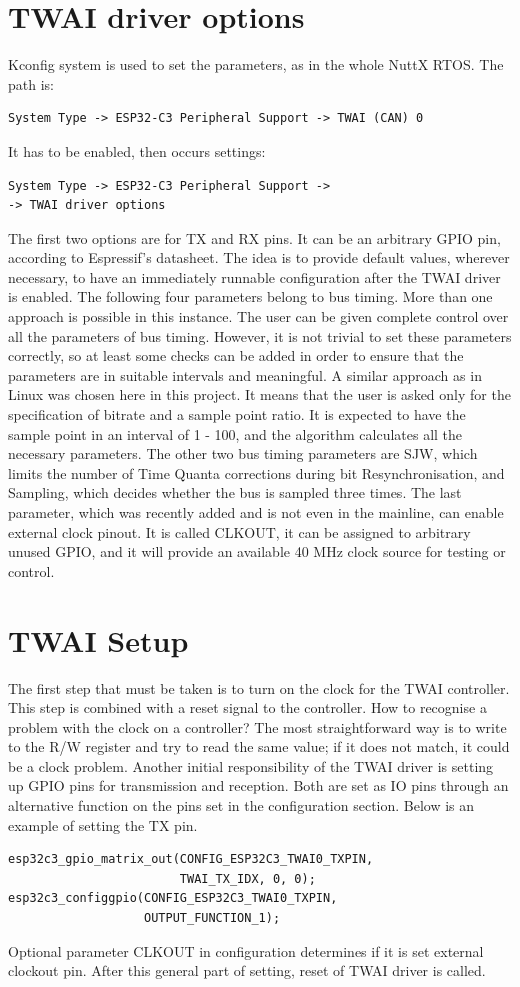 \documentclass{ctuthesis}
\begin{document}
 \section{TWAI driver options}
 Kconfig system is used to set the parameters, as in the whole NuttX RTOS. The path is:
\begin{verbatim}
System Type -> ESP32-C3 Peripheral Support -> TWAI (CAN) 0
\end{verbatim}
 It has to be enabled, then occurs settings:
\begin{verbatim}
System Type -> ESP32-C3 Peripheral Support ->
-> TWAI driver options
\end{verbatim}
 The first two options are for TX and RX pins. It can be an arbitrary GPIO pin, according to Espressif's datasheet. The idea is to provide default values, wherever necessary, to have an immediately runnable configuration after the TWAI driver is enabled. The following four parameters belong to bus timing. More than one approach is possible in this instance. The user can be given complete control over all the parameters of bus timing. However, it is not trivial to set these parameters correctly, so at least some checks can be added in order to ensure that the parameters are in suitable intervals and meaningful. A similar approach as in Linux was chosen here in this project. It means that the user is asked only for the specification of bitrate and a sample point ratio. It is expected to have the sample point in an interval of 1 - 100, and the algorithm calculates all the necessary parameters. The other two bus timing parameters are SJW, which limits the number of Time Quanta corrections during bit Resynchronisation, and Sampling, which decides whether the bus is sampled three times. The last parameter, which was recently added and is not even in the mainline\cite{nuttx-mainline}, can enable external clock pinout. It is called CLKOUT, it can be assigned to arbitrary unused GPIO, and it will provide an available 40 MHz clock source for testing or control.
 
 \section{TWAI Setup}
 The first step that must be taken is to turn on the clock for the TWAI controller. This step is combined with a reset signal to the controller. How to recognise a problem with the clock on a controller? The most straightforward way is to write to the R/W register and try to read the same value; if it does not match, it could be a clock problem. Another initial responsibility of the TWAI driver is setting up GPIO pins for transmission and reception. Both are set as IO pins through an alternative function on the pins set in the configuration section. Below is an example of setting the TX pin.
\begin{verbatim}
esp32c3_gpio_matrix_out(CONFIG_ESP32C3_TWAI0_TXPIN,
                        TWAI_TX_IDX, 0, 0);
esp32c3_configgpio(CONFIG_ESP32C3_TWAI0_TXPIN,
                   OUTPUT_FUNCTION_1);
\end{verbatim}
 Optional parameter CLKOUT in configuration determines if it is set external clockout pin. After this general part of setting, reset of TWAI driver is called.
 
\end{document}
